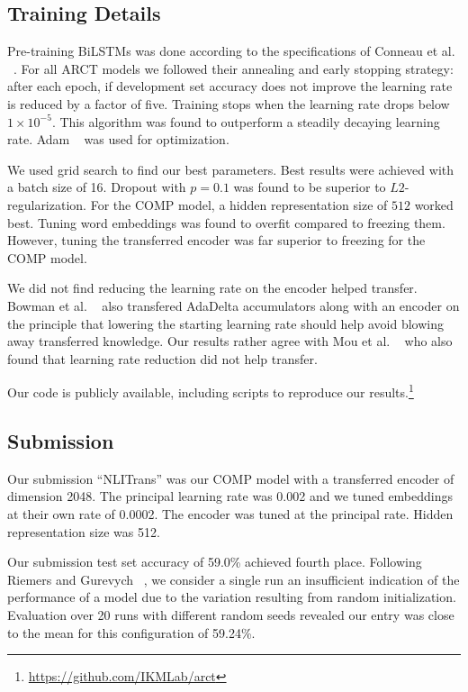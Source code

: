 \documentclass[11pt,a4paper]{article}
\begin{document}
\subsection{Training Details}

Pre-training BiLSTMs was done according to the specifications of Conneau et al. 
  ~.
For all ARCT models we followed their annealing and early stopping strategy:
  after each epoch, if development set accuracy does not improve
  the learning rate is reduced by a factor of five.
Training stops when the learning rate drops below $1 \times 10^{-5}$.
This algorithm was found to outperform a steadily decaying learning rate.
Adam ~\cite{DBLP:journals/corr/KingmaB14} was used for optimization.

We used grid search to find our best parameters.
Best results were achieved with a batch size of 16.
Dropout with $p=0.1$ was found to be superior to $L2$-regularization.
For the COMP model, a hidden representation size of $512$ worked best.
Tuning word embeddings was found to overfit compared to freezing them.
However, tuning the transferred encoder was far superior to freezing for the COMP model.

We did not find reducing the learning rate on the encoder helped transfer.
Bowman et al. ~ 
  also transfered AdaDelta accumulators along with an encoder
  on the principle that lowering the starting learning rate should help avoid blowing away transferred knowledge.
Our results rather agree with Mou et al. ~ 
  who also found that learning rate reduction did not help transfer.

Our code is publicly available,
  including scripts to reproduce our results.\footnote{\href{https://github.com/IKMLab/arct}{https://github.com/IKMLab/arct}}

\subsection{Submission}

Our submission ``NLITrans'' was our COMP model with a transferred encoder of dimension 2048.
The principal learning rate was 0.002
  and we tuned embeddings at their own rate of 0.0002.
The encoder was tuned at the principal rate.
Hidden representation size was 512.

Our submission test set accuracy of 59.0\% achieved fourth place.
Following Riemers and Gurevych ~, 
  we consider a single run an insufficient indication of the performance of a model
  due to the variation resulting from random initialization.
Evaluation over 20 runs with different random seeds
  revealed our entry was close to the mean for this configuration of 59.24\%.
\end{document}
